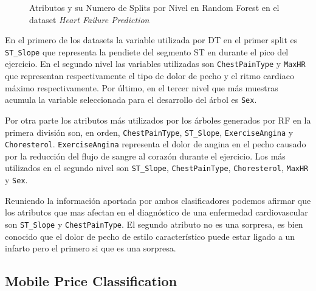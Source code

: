 \documentclass[..]{subfiles}
\begin{document}
\begin{figure}[h!]
\centering
{}
\caption[]{Atributos y su Numero de Splits por Nivel en Random Forest en el dataset \textit{Heart Failure Prediction} \footnotemark}%
\end{figure}

En el primero de los datasets la variable utilizada por DT en el primer split es \texttt{ST\_Slope} que representa la pendiete del segmento ST en durante el pico del ejercicio. En el segundo nivel las variables utilizadas son \texttt{ChestPainType} y \texttt{MaxHR} que representan respectivamente el tipo de dolor de pecho y el ritmo cardiaco máximo respectivamente. Por último, en el tercer nivel que más muestras acumula la variable seleccionada para el desarrollo del árbol es \texttt{Sex}.

Por otra parte los atributos más utilizados por los árboles generados por RF en la primera división son, en orden, \texttt{ChestPainType}, \texttt{ST\_Slope}, \texttt{ExerciseAngina} y \texttt{Choresterol}. \texttt{ExerciseAngina} representa el dolor de angina en el pecho causado por la reducción del flujo de sangre al corazón durante el ejercicio. Los más utilizados en el segundo nivel son \texttt{ST\_Slope}, \texttt{ChestPainType}, \texttt{Choresterol}, \texttt{MaxHR} y \texttt{Sex}.

Reuniendo la información aportada por ambos clasificadores podemos afirmar que los atributos que mas afectan en el diagnóstico de una enfermedad cardiovascular son \texttt{ST\_Slope} y \texttt{ChestPainType}. El segundo atributo no es una sorpresa, es bien conocido que el dolor de pecho de estilo característico puede estar ligado a un infarto pero el primero si que es una sorpresa.


\subsection{Mobile Price Classification}
\end{document}
